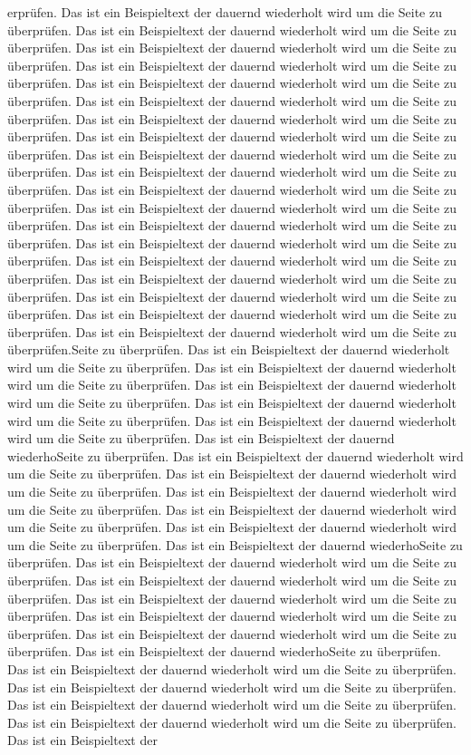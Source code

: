 erprüfen. Das ist ein Beispieltext der dauernd wiederholt wird um die Seite zu überprüfen. Das ist ein Beispieltext der dauernd wiederholt wird um die Seite zu überprüfen. Das ist ein Beispieltext der dauernd wiederholt wird um die Seite zu überprüfen. Das ist ein Beispieltext der dauernd wiederholt wird um die Seite zu überprüfen. Das ist ein Beispieltext der dauernd wiederholt wird um die Seite zu überprüfen. Das ist ein Beispieltext der dauernd wiederholt wird um die Seite zu überprüfen. Das ist ein Beispieltext der dauernd wiederholt wird um die Seite zu überprüfen. Das ist ein Beispieltext der dauernd wiederholt wird um die Seite zu überprüfen. Das ist ein Beispieltext der dauernd wiederholt wird um die Seite zu überprüfen. Das ist ein Beispieltext der dauernd wiederholt wird um die Seite zu überprüfen. Das ist ein Beispieltext der dauernd wiederholt wird um die Seite zu überprüfen. Das ist ein Beispieltext der dauernd wiederholt wird um die Seite zu überprüfen. Das ist ein Beispieltext der dauernd wiederholt wird um die Seite zu überprüfen. Das ist ein Beispieltext der dauernd wiederholt wird um die Seite zu überprüfen. Das ist ein Beispieltext der dauernd wiederholt wird um die Seite zu überprüfen. Das ist ein Beispieltext der dauernd wiederholt wird um die Seite zu überprüfen. Das ist ein Beispieltext der dauernd wiederholt wird um die Seite zu überprüfen. Das ist ein Beispieltext der dauernd wiederholt wird um die Seite zu überprüfen. Das ist ein Beispieltext der dauernd wiederholt wird um die Seite zu überprüfen.Seite zu überprüfen. Das ist ein Beispieltext der dauernd wiederholt wird um die Seite zu überprüfen. Das ist ein Beispieltext der dauernd wiederholt wird um die Seite zu überprüfen. Das ist ein Beispieltext der dauernd wiederholt wird um die Seite zu überprüfen. Das ist ein Beispieltext der dauernd wiederholt wird um die Seite zu überprüfen. Das ist ein Beispieltext der dauernd wiederholt wird um die Seite zu überprüfen. Das ist ein Beispieltext der dauernd wiederhoSeite zu überprüfen. Das ist ein Beispieltext der dauernd wiederholt wird um die Seite zu überprüfen. Das ist ein Beispieltext der dauernd wiederholt wird um die Seite zu überprüfen. Das ist ein Beispieltext der dauernd wiederholt wird um die Seite zu überprüfen. Das ist ein Beispieltext der dauernd wiederholt wird um die Seite zu überprüfen. Das ist ein Beispieltext der dauernd wiederholt wird um die Seite zu überprüfen. Das ist ein Beispieltext der dauernd wiederhoSeite zu überprüfen. Das ist ein Beispieltext der dauernd wiederholt wird um die Seite zu überprüfen. Das ist ein Beispieltext der dauernd wiederholt wird um die Seite zu überprüfen. Das ist ein Beispieltext der dauernd wiederholt wird um die Seite zu überprüfen. Das ist ein Beispieltext der dauernd wiederholt wird um die Seite zu überprüfen. Das ist ein Beispieltext der dauernd wiederholt wird um die Seite zu überprüfen. Das ist ein Beispieltext der dauernd wiederhoSeite zu überprüfen. Das ist ein Beispieltext der dauernd wiederholt wird um die Seite zu überprüfen. Das ist ein Beispieltext der dauernd wiederholt wird um die Seite zu überprüfen. Das ist ein Beispieltext der dauernd wiederholt wird um die Seite zu überprüfen. Das ist ein Beispieltext der dauernd wiederholt wird um die Seite zu überprüfen. Das ist ein Beispieltext der 
